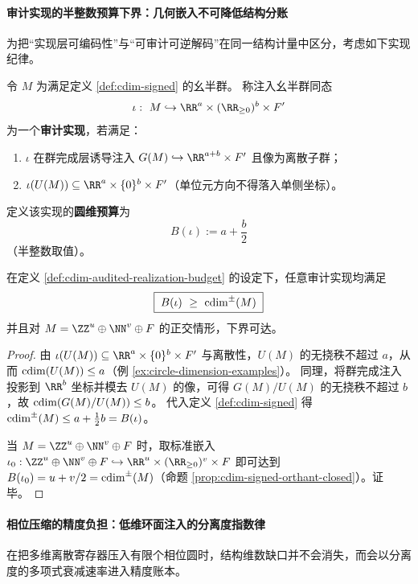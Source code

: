 \paragraph{审计实现的半整数预算下界：几何嵌入不可降低结构分账}
为把“实现层可编码性”与“可审计可逆解码”在同一结构计量中区分，考虑如下实现纪律。

\begin{definition}[审计实现与圆维预算]\label{def:cdim-audited-realization-budget}
令 \(M\) 为满足定义 \ref{def:cdim-signed} 的幺半群。
称注入幺半群同态
\[
\iota:\ M\hookrightarrow \RR^{a}\times (\RR_{\ge 0})^{b}\times F'
\]
为一个\textbf{审计实现}，若满足：
\begin{enumerate}
  \item \(\iota\) 在群完成层诱导注入
        \(
        G(M)\hookrightarrow \RR^{a+b}\times F'
        \)
        且像为离散子群；
  \item \(\iota(U(M))\subseteq \RR^{a}\times\{0\}^{b}\times F'\)（单位元方向不得落入单侧坐标）。
\end{enumerate}
定义该实现的\textbf{圆维预算}为
\[
\boxed{\;B(\iota):=a+\frac{b}{2}\;}
\]
（半整数取值）。
\end{definition}

\begin{theorem}[审计实现的最小圆维预算下界]\label{thm:cdim-audited-realization-budget-lower-bound}
在定义 \ref{def:cdim-audited-realization-budget} 的设定下，任意审计实现均满足
\[
\boxed{\;B(\iota)\ \ge\ \cdim^{\pm}(M)\;}
\]
并且对 \(M=\ZZ^{u}\oplus \NN^{v}\oplus F\) 的正交情形，下界可达。
\end{theorem}
\begin{proof}
由 \(\iota(U(M))\subseteq \RR^{a}\times\{0\}^{b}\times F'\) 与离散性，\(U(M)\) 的无挠秩不超过 \(a\)，从而
\(
\operatorname{cdim}(U(M))\le a
\)（例 \ref{ex:circle-dimension-examples}）。
同理，将群完成注入投影到 \(\RR^{b}\) 坐标并模去 \(U(M)\) 的像，可得 \(G(M)/U(M)\) 的无挠秩不超过 \(b\)，故
\(
\operatorname{cdim}(G(M)/U(M))\le b
\)。
代入定义 \ref{def:cdim-signed} 得
\(
\operatorname{cdim}^{\pm}(M)\le a+\frac12 b=B(\iota)
\)。
\par
当 \(M=\ZZ^{u}\oplus \NN^{v}\oplus F\) 时，取标准嵌入
\(
\iota_0:\ZZ^{u}\oplus \NN^{v}\oplus F\hookrightarrow \RR^{u}\times (\RR_{\ge 0})^{v}\times F
\)
即可达到 \(B(\iota_0)=u+v/2=\operatorname{cdim}^{\pm}(M)\)（命题 \ref{prop:cdim-signed-orthant-closed}）。证毕。
\end{proof}

\paragraph{相位压缩的精度负担：低维环面注入的分离度指数律}\label{para:cdim-phase-precision-tradeoff}
在把多维离散寄存器压入有限个相位圆时，结构维数缺口并不会消失，而会以分离度的多项式衰减速率进入精度账本。

